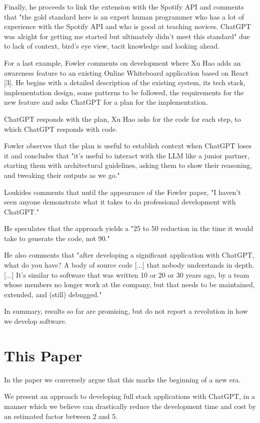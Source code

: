 \documentclass[runningheads]{llncs}
\begin{document}
Finally, he proceeds to link the extension with the Spotify API and comments that "the gold standard here is an expert human programmer who has a lot of experience with the Spotify API and who is good at teaching novices. ChatGPT was alright for getting me started but ultimately didn't meet this standard" due to lack of context, bird's eye view, tacit knowledge and looking ahead.

For a last example, Fowler\cite{Fowler2023} comments on development where Xu Hao adds an awareness feature to an existing Online Whiteboard application based on React [3]. He begins with a detailed description of the existing system, its tech stack, implementation design, some patterns to be followed, the requirements for the new feature and asks ChatGPT for a plan for the implementation.

ChatGPT responds with the plan, Xu Hao asks for the code for each step, to which ChatGPT responds with code.

Fowler observes that the plan is useful to establish context when ChatGPT loses it and concludes that "it's useful to interact with the LLM like a junior partner, starting them with architectural guidelines, asking them to show their reasoning, and tweaking their outputs as we go."

Loukides\cite{Loukides2023} comments that until the appearance of the Fowler paper, "I haven't seen anyone demonstrate what it takes to do professional development with ChatGPT."

He speculates that the approach yields a "25 to 50 reduction in the time it would take to generate the code, not 90."

He also comments that "after developing a significant application with ChatGPT, what do you have? A body of source code [...] that nobody understands in depth. [...] It's similar to software that was written 10 or 20 or 30 years ago, by a team whose members no longer work at the company, but that needs to be maintained, extended, and (still) debugged."

In summary, results so far are promising, but do not report a revolution in how we develop software.
%
\section*{This Paper}
In the paper we conversely argue that this marks the beginning of a new era. 

We present an approach to developing full stack applications with ChatGPT, in a manner which we believe can drastically reduce the development time and cost by an estimated factor between 2 and 5. 
\end{document}
